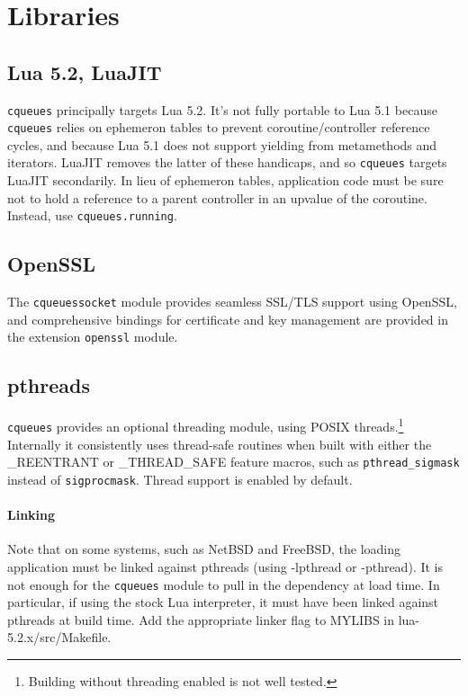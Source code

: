 \documentclass[11pt, oneside]{memoir}
\newcommand*{\cqueues}[0]{\texttt{cqueues}\xspace}
\newcommand*{\syscall}[1]{\texttt{#1}\xspace}
\newcommand*{\fn}[1]{\texttt{#1}\xspace}
\newcommand*{\module}[1]{\texttt{#1}\xspace}
\begin{document}
\section{Libraries}

\subsection{Lua 5.2, LuaJIT}
\cqueues principally targets Lua 5.2. It's not fully portable to Lua 5.1 because \cqueues relies on ephemeron tables to prevent coroutine/controller reference cycles, and because Lua 5.1 does not support yielding from metamethods and iterators. LuaJIT removes the latter of these handicaps, and so \cqueues targets LuaJIT secondarily. In lieu of ephemeron tables, application code must be sure not to hold a reference to a parent controller in an upvalue of the coroutine. Instead, use \fn{cqueues.running}.

\subsection{OpenSSL}
The \cqueues \module{socket} module provides seamless SSL/TLS support using OpenSSL, and comprehensive bindings for certificate and key management are provided in the extension \module{openssl} module.

\subsection{pthreads}

\cqueues provides an optional threading module, using POSIX threads.\footnote{Building without threading enabled is not well tested.} Internally it consistently uses thread-safe routines when built with either the \_REENTRANT or \_THREAD\_SAFE feature macros, such as \syscall{pthread\_sigmask} instead of \syscall{sigprocmask}. Thread support is enabled by default.

\paragraph{Linking}
Note that on some systems, such as NetBSD and FreeBSD, the loading application must be linked against pthreads (using -lpthread or -pthread). It is not enough for the \cqueues module to pull in the dependency at load time. In particular, if using the stock Lua interpreter, it must have been linked against pthreads at build time. Add the appropriate linker flag to MYLIBS in lua-5.2.x/src/Makefile.
\end{document}
